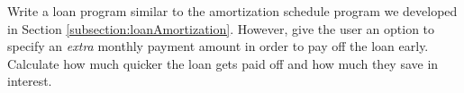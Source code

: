 \begin{exer}
Write a loan program similar to the amortization schedule program we developed in 
Section \ref{subsection:loanAmortization}.  However, give the user an option to 
specify an \emph{extra} monthly payment amount in order to pay off the loan
early.  Calculate how much quicker the loan gets paid off and how much they
save in interest.  
\end{exer}

%

